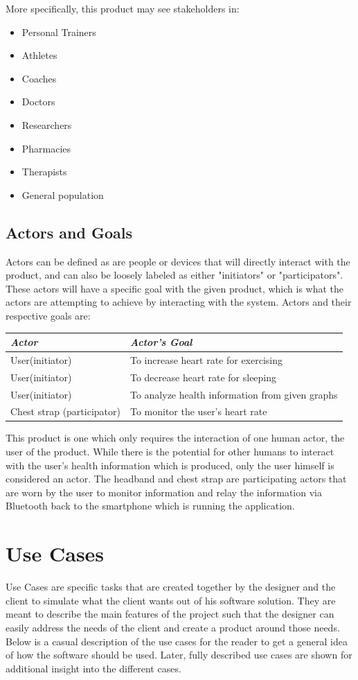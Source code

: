 \documentclass[letterpaper,english, 12pt]{scrreprt}
\begin{document}
More specifically, this product may see stakeholders in:
\begin{itemize}
	\item Personal Trainers
	\item Athletes
	\item Coaches
	\item Doctors
	\item Researchers
	\item Pharmacies
	\item Therapists
	\item General population
\end{itemize}

\subsection{Actors and Goals}
Actors can be defined as are people or devices that will directly interact with the product, and can also be loosely labeled as either "initiators" or "participators". These actors will have a specific goal with the given product, which is what the actors are attempting to achieve by interacting with the system. Actors and their respective goals are:
\begin{center}
	\begin{tabular}{|l|l|}
		\hline
		\emph{Actor} & \emph{Actor's Goal} \\\hline
		User(initiator)& To increase heart rate for exercising\\\hline
		User(initiator)& To decrease heart rate for sleeping\\\hline
		User(initiator)& To analyze health information from given graphs\\\hline
		Chest strap (participator)& To monitor the user's heart rate\\\hline
	\end{tabular}
\end{center}
This product is one which only requires the interaction of one human actor, the user of the product. While there is the potential for other humans to interact with the user's health information which is produced, only the user himself is considered an actor. The headband and chest strap are participating actors that are worn by the user to monitor information and relay the information via Bluetooth back to the smartphone which is running the application.

\section{Use Cases}
Use Cases are specific tasks that are created together by the designer and the client to simulate what the client wants out of his software solution. They are meant to describe the main features of the project such that the designer can easily address the needs of the client and create a product around those needs. Below is a casual description of the use cases for the reader to get a general idea of how the software should be used. Later, fully described use cases are shown for additional insight into the different cases.
\end{document}
